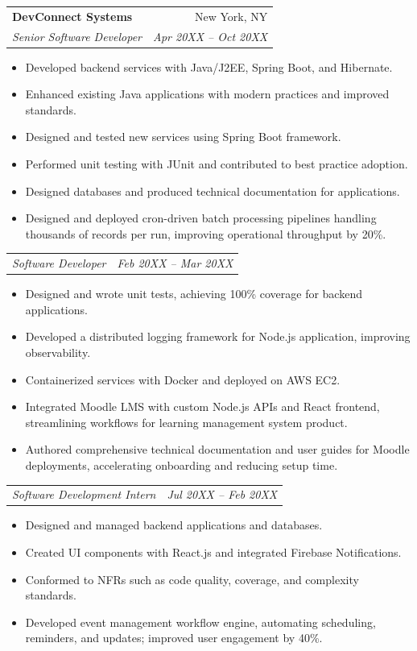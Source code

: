 \documentclass[letterpaper,10pt]{article}
\makeatletter
\newcommand{\resumeSubheading}[4]{
  \vspace{-1pt}\item
    \begin{tabular*}{0.97\textwidth}[t]{l@{\extracolsep{\fill}}r}
      \textbf{#1} & #2 \\
      \textit{\footnotesize#3} & \textit{\footnotesize #4} \\
    \end{tabular*}\vspace{-5pt}
}
\newcommand{\resumeSubSubheading}[2]{
    \begin{tabular*}{0.97\textwidth}{l@{\extracolsep{\fill}}r}
      \textit{\footnotesize#1} & \textit{\footnotesize #2} \\
    \end{tabular*}\vspace{-5pt}
}
\newcommand{\resumeItemListStart}{\begin{itemize}}
\newcommand{\resumeItemListEnd}{\end{itemize}\vspace{-5pt}}
\makeatother
\begin{document}
    \resumeSubheading
      {DevConnect Systems}{New York, NY}
      {Senior Software Developer}{Apr 20XX -- Oct 20XX}
      \resumeItemListStart
        \item \small Developed backend services with Java/J2EE, Spring Boot, and Hibernate.
        \item \small Enhanced existing Java applications with modern practices and improved standards.
        \item \small Designed and tested new services using Spring Boot framework.
        \item \small Performed unit testing with JUnit and contributed to best practice adoption.
        \item \small Designed databases and produced technical documentation for applications.
        \item \small Designed and deployed cron-driven batch processing pipelines handling thousands of records per run, improving operational throughput by 20\%.
      \resumeItemListEnd

      \resumeSubSubheading{Software Developer}{Feb 20XX -- Mar 20XX}
      \resumeItemListStart
        \item \small Designed and wrote unit tests, achieving 100\% coverage for backend applications.
        \item \small Developed a distributed logging framework for Node.js application, improving observability.
        \item \small Containerized services with Docker and deployed on AWS EC2.
        \item \small Integrated Moodle LMS with custom Node.js APIs and React frontend, streamlining workflows for learning management system product.
        \item \small Authored comprehensive technical documentation and user guides for Moodle deployments, accelerating onboarding and reducing setup time.
      \resumeItemListEnd

      \resumeSubSubheading{Software Development Intern}{Jul 20XX -- Feb 20XX}
      \resumeItemListStart
        \item \small Designed and managed backend applications and databases.
        \item \small Created UI components with React.js and integrated Firebase Notifications.
        \item \small Conformed to NFRs such as code quality, coverage, and complexity standards.
        \item \small Developed event management workflow engine, automating scheduling, reminders, and updates; improved user engagement by 40\%.
      \resumeItemListEnd
\end{document}
